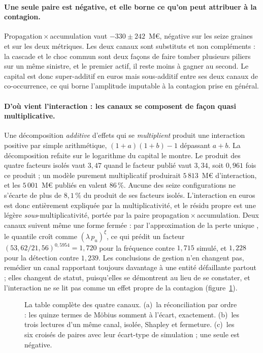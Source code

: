 \paragraph{Une seule paire est négative, et elle borne ce qu'on peut attribuer à la contagion.}
Propagation\,$\times$\,accumulation vaut $-330\pm242$~M\euro, négative sur les seize graines et sur
les deux métriques. Les deux canaux sont substituts et non compléments : la cascade et le choc
commun sont deux façons de faire tomber plusieurs piliers sur un même sinistre, et le premier
actif, il reste moins à gagner au second. Le capital est donc super-additif en euros mais
sous-additif entre ses deux canaux de co-occurrence, ce qui borne l'amplitude imputable à la
contagion prise en général.

\paragraph{D'où vient l'interaction : les canaux se composent de façon quasi multiplicative.} Une
décomposition \emph{additive} d'effets qui se \emph{multiplient} produit une interaction positive
par simple arithmétique, $(1+a)(1+b)-1$ dépassant $a+b$. La décomposition refaite sur le logarithme
du capital le montre. Le produit des quatre facteurs isolés vaut $3{,}47$ quand le facteur publié
vaut $3{,}34$, soit $0{,}961$ fois ce produit ; un modèle purement multiplicatif produirait $5\,813$~M\euro{}
d'interaction, et les $5\,001$~M\euro{} publiés en valent $86\,\%$. Aucune des seize configurations
ne s'écarte de plus de $8{,}1\,\%$ du produit de ses facteurs isolés. L'interaction en euros est
donc entièrement expliquée par la multiplicativité, et le résidu propre est une légère
\emph{sous}-multiplicativité, portée par la paire propagation\,$\times$\,accumulation. Deux canaux
suivent même une forme fermée : par l'approximation de la perte unique
\citep{bockerkluppelberg2005}, le quantile croît comme
$(\lambda\,p_u)^{\xi}$, ce qui prédit un facteur $(53{,}62/21{,}56)^{0{,}5954}=1{,}720$ pour la
fréquence contre $1{,}715$ simulé, et $1{,}228$ pour la détection contre $1{,}239$. Les conclusions
de gestion n'en changent pas, remédier un canal rapportant toujours davantage à une entité
défaillante partout ; elles changent de statut, puisqu'elles se démontrent au lieu de se constater,
et l'interaction ne se lit pas comme un effet propre de la contagion
(figure~\ref{fig:interaction-canaux}).

\begin{figure}[htbp]\centering
{}
\caption{La table complète des quatre canaux. (a)~la réconciliation par ordre : les quinze termes
de Möbius somment à l'écart, exactement. (b)~les trois lectures d'un même canal, isolée, Shapley
et fermeture. (c)~les six croisés de paires avec leur écart-type de simulation ; une seule est
négative.}
\label{fig:interaction-canaux}
\end{figure}


